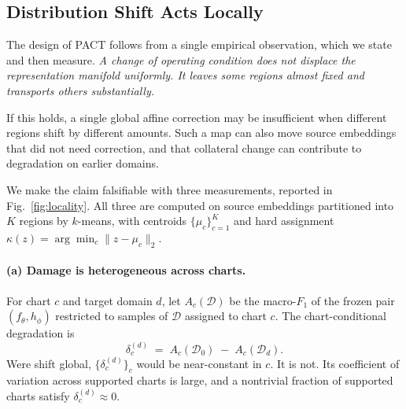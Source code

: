 \documentclass[letterpaper]{article} %
\begin{document}
\subsection{Distribution Shift Acts Locally}
\label{sec:locality}

The design of \textsc{PACT} follows from a single empirical observation, which
we state and then measure. \emph{A change of operating condition does not
displace the representation manifold uniformly. It leaves some regions almost
fixed and transports others substantially.}

If this holds, a single global affine correction may be insufficient when
different regions shift by different amounts. Such a map can also move source
embeddings that did not need correction, and that collateral change can
contribute to degradation on earlier domains.

We make the claim falsifiable with three measurements, reported in
Fig.~\ref{fig:locality}. All three are computed on source embeddings partitioned
into $K$ regions by $k$-means, with centroids $\{\mu_c\}_{c=1}^{K}$ and hard
assignment $\kappa(z)=\arg\min_c\lVert z-\mu_c\rVert_2$.

\paragraph{(a) Damage is heterogeneous across charts.}
For chart $c$ and target domain $d$, let $A_c(\mathcal{D})$ be the macro-$F_1$
of the frozen pair $(f_\theta,h_\phi)$ restricted to samples of $\mathcal{D}$
assigned to chart $c$. The chart-conditional degradation is
\begin{equation}
\delta_c^{(d)} \;=\; A_c(\mathcal{D}_0)\;-\;A_c(\mathcal{D}_d).
\end{equation}
Were shift global, $\{\delta_c^{(d)}\}_c$ would be near-constant in $c$. It is
not. Its coefficient of variation across supported charts is large, and a
nontrivial fraction of supported charts satisfy $\delta_c^{(d)}\approx 0$.
\end{document}
